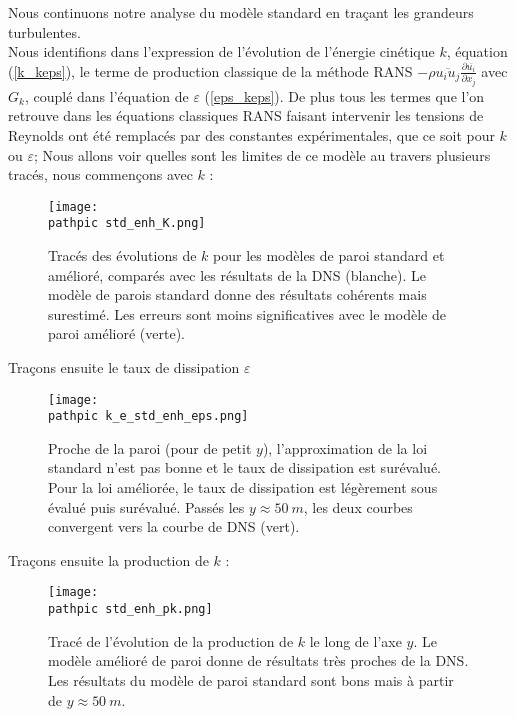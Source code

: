 \documentclass[a4paper,10pt]{article}
\newcommand\pathpic{/home/saura/Documents/Latex_files/Pic/}
\begin{document}
\noindent Nous continuons notre analyse du modèle standard en traçant les grandeurs turbulentes. \\

Nous identifions dans l'expression de l'évolution de l'énergie cinétique $k$, équation (\ref{k_keps}), le terme de production classique de la méthode RANS $-\rho \overline{u_i u_j} \frac{\partial \overline{u_i}}{\partial x_j}$ avec $G_k$, couplé dans l'équation de $\varepsilon$ (\ref{eps_keps}). De plus tous les termes que l'on retrouve dans les équations classiques RANS faisant intervenir les tensions de Reynolds ont été remplacés par des constantes expérimentales, que ce soit pour $k$ ou $\varepsilon$; Nous allons voir quelles sont les limites de ce modèle au travers plusieurs tracés, nous commençons avec $k$ : 
\begin{figure}[ht!]
\centering
\texttt{[image: \\pathpic std\_enh\_K.png]}
\caption{Tracés des évolutions de $k$ pour les modèles de paroi standard et amélioré, comparés avec les résultats de la DNS (blanche). Le modèle de parois standard donne des résultats cohérents mais surestimé. Les erreurs sont moins significatives avec le modèle de paroi amélioré (verte).}
\label{std_enh_k}
\end{figure}

Traçons ensuite le taux de dissipation $\varepsilon$ 

\pagebreak

\begin{figure}[ht!]
\centering
\texttt{[image: \\pathpic k\_e\_std\_enh\_eps.png]}
\caption{\footnotesize{Proche de la paroi (pour de petit $y$), l'approximation de la loi standard n'est pas bonne et le taux de dissipation est surévalué. Pour la loi améliorée, le taux de dissipation est légèrement sous évalué puis surévalué. Passés les $y \approx 50\ m$, les deux courbes convergent vers la courbe de DNS (vert).}}
\label{std_enh_eps}
\end{figure}


Traçons ensuite la production de $k$ :

\begin{figure}[ht!]
\centering
\texttt{[image: \\pathpic std\_enh\_pk.png]}
\caption{Tracé de l'évolution de la production de $k$ le long de l'axe $y$. Le modèle amélioré de paroi donne de résultats très proches de la DNS. Les résultats du modèle de paroi standard sont bons mais à partir de $y \approx 50 \ m$.}
\label{std_enh_P_k}
\end{figure}
\end{document}
